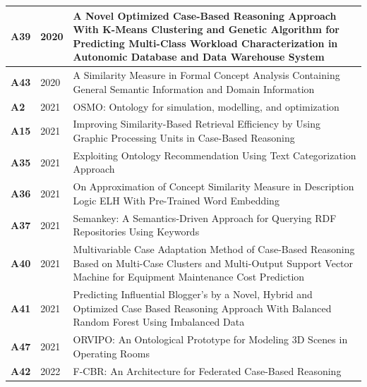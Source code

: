 {\begin{longtable}{ | m{1cm} | m{1.5cm} | m{12cm} | }
                    \hline
                    \textbf{A39} &2020 &A Novel Optimized Case-Based Reasoning Approach With K-Means Clustering and Genetic Algorithm for Predicting Multi-Class Workload Characterization in Autonomic Database and Data Warehouse System \cite{shaheen2020novel}\\
                    \hline
                    \textbf{A43} &2020 &A Similarity Measure in Formal Concept Analysis Containing General Semantic Information and Domain Information \cite{wang2020similarity} \\
                    \hline
                    \textbf{A2} &2021 &OSMO: Ontology for simulation, modelling, and optimization \cite{horsch2021osmo} \\
                    \hline
                    \textbf{A15} &2021 &Improving Similarity-Based Retrieval Efficiency by Using Graphic Processing Units in Case-Based Reasoning \cite{malburg2021improving} \\
                    \hline
                    \textbf{A35} &2021 &Exploiting Ontology Recommendation Using Text Categorization Approach \cite{sarwar2020exploiting} \\
                    \hline
                    \textbf{A36} &2021 &On Approximation of Concept Similarity Measure in Description Logic ELH With Pre-Trained Word Embedding \cite{racharak2021approximation}\\
                    \hline
                    \textbf{A37} &2021 &Semankey: A Semantics-Driven Approach for Querying RDF Repositories Using Keywords \cite{abad2021semankey} \\
                    \hline
                    \textbf{A40} &2021 &Multivariable Case Adaptation Method of Case-Based Reasoning Based on Multi-Case Clusters and Multi-Output Support Vector Machine for Equipment Maintenance Cost Prediction \cite{lin2021multivariable} \\
                    \hline
                    \textbf{A41} &2021 &Predicting Influential Blogger’s by a Novel, Hybrid and Optimized Case Based Reasoning Approach With Balanced Random Forest Using Imbalanced Data \cite{asim2020predicting}\\
                    \hline
                    \textbf{A47} &2021 &ORVIPO: An Ontological Prototype for Modeling 3D Scenes in Operating Rooms \cite{jaziri2021orvipo} \\
                    \hline
                    \textbf{A42} &2022 &F-CBR: An Architecture for Federated Case-Based Reasoning \cite{jaiswal2022f} \\

\end{longtable}}
